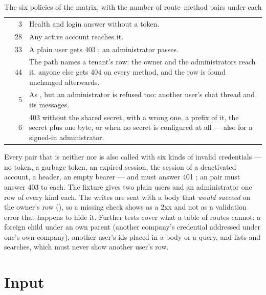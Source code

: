 \begin{table}[H]
\caption{The six policies of the matrix, with the number of route--method pairs under each}\label{tab:security:policies}
\begin{tabularx}{\textwidth}{@{}L{22mm}rY@{}}
\toprule
{} &  &  \\
\midrule
{} & 3 & Health and login answer without a token. \\
 & 28 & Any active account reaches it. \\
 & 33 & A plain user gets 403 ; an administrator passes. \\
 & 44 & The path names a tenant's row: the owner and the administrators reach it, anyone else gets 404 on every method, and the row is found unchanged afterwards. \\
 & 5 & As , but an administrator is refused too: another user's chat thread and its messages. \\
 & 6 & 403  without the shared secret, with a wrong one, a prefix of it, the secret plus one byte, or when no secret is configured at all --- also for a signed-in administrator. \\
\bottomrule
\end{tabularx}
\end{table}

Every pair that is neither  nor  is also called with six kinds
of invalid credentials --- no token, a garbage token, an expired session, the session of a
deactivated account, a  header, an empty bearer --- and must answer 401
; an  pair must answer 403  to each. The
fixture gives two plain users and an administrator one row of every kind each. The
writes are sent with a body that \emph{would succeed} on the owner's row (),
so a missing check shows as a 2xx and not as a validation error that happens to hide it.
Further tests cover what a table of routes cannot: a foreign child under an own parent
(another company's credential addressed under one's own company), another user's ids placed
in a body or a query, and lists and searches, which must never show another user's row.


\section{Input}\label{sec:security:input}

